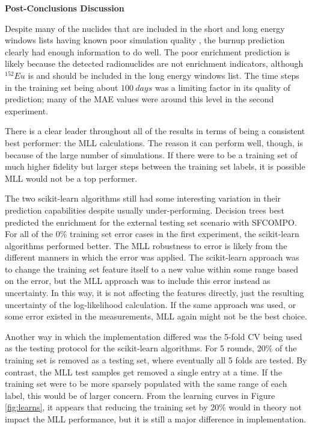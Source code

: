 \noindent \textbf{Post-Conclusions Discussion}

Despite many of the nuclides that are included in the short and long energy
windows lists having known poor simulation quality \cite{pwr_benchmark_2010,
skutnik_2021}, the burnup prediction clearly had enough information to do well.
The poor enrichment prediction is likely because the detected radionuclides are
not enrichment indicators, although ${}^{152}\textit{Eu}$ is and should be
included in the long energy windows list. The time steps in the training set being about $100\:days$ was a limiting
factor in its quality of prediction; many of the \gls{MAE} values were around
this level in the second experiment. 

There is a clear leader throughout all of the results in terms of being a
consistent best performer: the \gls{MLL} calculations. The reason it can
perform well, though, is because of the large number of simulations.  If there
were to be a training set of much higher fidelity but larger steps between the
training set labels, it is possible \gls{MLL} would not be a top performer. 

The two scikit-learn algorithms still had some interesting variation in their
prediction capabilities despite usually under-performing. Decision trees best
predicted the enrichment for the external testing set scenario with
\gls{SFCOMPO}. For all of the 0\% training set error cases in the first
experiment, the scikit-learn algorithms performed better.  The \gls{MLL}
robustness to error is likely from the different manners in which the error was
applied.  The scikit-learn approach was to change the training set feature
itself to a new value within some range based on the error, but the \gls{MLL}
approach was to include this error instead as uncertainty. In this way, it is
not affecting the features directly, just the resulting uncertainty of the
log-likelihood calculation. If the same approach was used, or some error
existed in the measurements, \gls{MLL} again might not be the best choice. 

Another way in which the implementation differed was the 5-fold \gls{CV} being
used as the testing protocol for the scikit-learn algorithms. For 5 rounds,
20\% of the training set is removed as a testing set, where eventually all 5
folds are tested.  By contrast, the \gls{MLL} test samples get removed a single
entry at a time.  If the training set were to be more sparsely populated with
the same range of each label, this would be of larger concern.  From the
learning curves in Figure \ref{fig:learns}, it appears that reducing the
training set by 20\% would in theory not impact the \gls{MLL} performance, but
it is still a major difference in implementation. 

